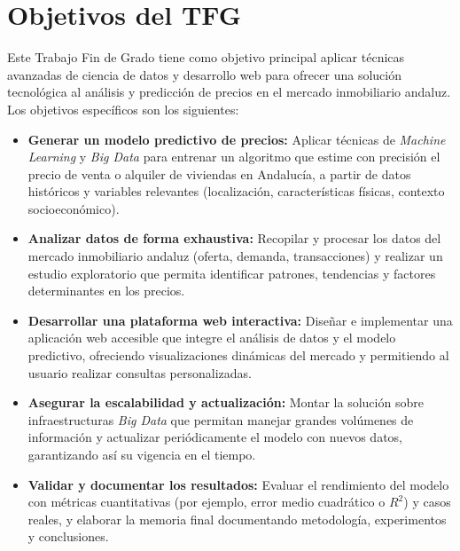\documentclass[a4paper,11pt]{book}
\begin{document}
 

\section*{Objetivos del TFG}

Este Trabajo Fin de Grado tiene como objetivo principal aplicar técnicas avanzadas de ciencia de datos y desarrollo web para ofrecer una solución tecnológica al análisis y predicción de precios en el mercado inmobiliario andaluz. Los objetivos específicos son los siguientes:

\begin{itemize}
  \item \textbf{Generar un modelo predictivo de precios:} Aplicar técnicas de \textit{Machine Learning} y \textit{Big Data} para entrenar un algoritmo que estime con precisión el precio de venta o alquiler de viviendas en Andalucía, a partir de datos históricos y variables relevantes (localización, características físicas, contexto socioeconómico).
  
  \item \textbf{Analizar datos de forma exhaustiva:} Recopilar y procesar los datos del mercado inmobiliario andaluz (oferta, demanda, transacciones) y realizar un estudio exploratorio que permita identificar patrones, tendencias y factores determinantes en los precios.
  
  \item \textbf{Desarrollar una plataforma web interactiva:} Diseñar e implementar una aplicación web accesible que integre el análisis de datos y el modelo predictivo, ofreciendo visualizaciones dinámicas del mercado y permitiendo al usuario realizar consultas personalizadas.
  
  \item \textbf{Asegurar la escalabilidad y actualización:} Montar la solución sobre infraestructuras \textit{Big Data} que permitan manejar grandes volúmenes de información y actualizar periódicamente el modelo con nuevos datos, garantizando así su vigencia en el tiempo.
  
  \item \textbf{Validar y documentar los resultados:} Evaluar el rendimiento del modelo con métricas cuantitativas (por ejemplo, error medio cuadrático o $R^2$) y casos reales, y elaborar la memoria final documentando metodología, experimentos y conclusiones.
\end{itemize}
\end{document}
